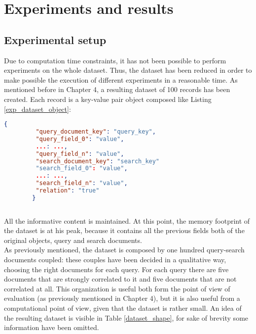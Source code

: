 \documentclass[\main/main.tex]{subfiles}
\begin{document}
\chapter{Experiments and results}
\section{Experimental setup}
Due to computation time constraints, it has not been possible to perform experiments on the whole dataset. Thus, the dataset has been reduced in order to make possible the execution of different experiments in a reasonable time. As mentioned before in Chapter 4, a resulting dataset of 100 records has been created. Each record is a key-value pair object composed like Listing \ref{exp_dataset_object}:
\begin{center}
    \begin{lstlisting}[language=json, caption="Experimental dataset object", captionpos=b, label={exp_dataset_object}]
        {
         "query_document_key": "query_key",
         "query_field_0": "value",
         ...: ...,
         "query_field_n": "value",
         "search_document_key": "search_key"
         "search_field_0": "value",
         ...: ...,
         "search_field_n": "value",
         "relation": "true"
        }
    
    \end{lstlisting}
\end{center}
All the informative content is maintained. At this point, the memory footprint of the dataset is at his peak, because it contains all the previous fields both of the original objects, query and search documents.\\
As previously mentioned, the dataset is composed by one hundred query-search documents coupled: these couples have been decided in a qualitative way, choosing the right documents for each query. For each query there are five documents that are strongly correlated to it and five documents that are not correlated at all. This organization is useful both form the point of view of evaluation (as previously mentioned in Chapter 4), but it is also useful from a computational point of view, given that the dataset is rather small.
An idea of the resulting dataset is visible in Table \ref{dataset_shape}, for sake of brevity some information have been omitted.
\end{document}

